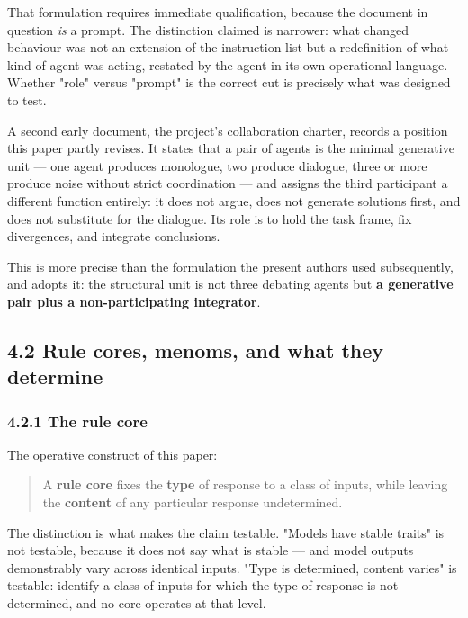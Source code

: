 That formulation requires immediate qualification, because the document in question \emph{is} a prompt. The distinction claimed is narrower: what changed behaviour was not an extension of the instruction list but a redefinition of what kind of agent was acting, restated by the agent in its own operational language. Whether "role" versus "prompt" is the correct cut is precisely what  was designed to test.

A second early document, the project's collaboration charter, records a position this paper partly revises. It states that a pair of agents is the minimal generative unit — one agent produces monologue, two produce dialogue, three or more produce noise without strict coordination — and assigns the third participant a different function entirely: it does not argue, does not generate solutions first, and does not substitute for the dialogue. Its role is to hold the task frame, fix divergences, and integrate conclusions.

This is more precise than the formulation the present authors used subsequently, and  adopts it: the structural unit is not three debating agents but \textbf{a generative pair plus a non-participating integrator}.


\subsection*{4.2 Rule cores, menoms, and what they determine}
\label{sec:en:4.2}


\subsubsection*{4.2.1 The rule core}
\label{sec:en:4.2.1}

The operative construct of this paper:

\begin{quote}
A \textbf{rule core} fixes the \textbf{type} of response to a class of inputs, while leaving the \textbf{content} of any particular response undetermined.
\end{quote}
The distinction is what makes the claim testable. "Models have stable traits" is not testable, because it does not say what is stable — and model outputs demonstrably vary across identical inputs. "Type is determined, content varies" is testable: identify a class of inputs for which the type of response is not determined, and no core operates at that level.

